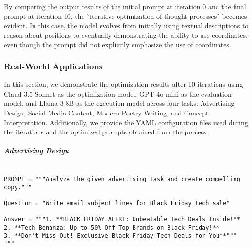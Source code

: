 By comparing the output results of the initial prompt at iteration 0 and the final prompt at iteration 10, the ``iterative optimization of thought processes'' becomes evident. In this case, the model evolves from initially using textual descriptions to reason about positions to eventually demonstrating the ability to use coordinates, even though the prompt did not explicitly emphasize the use of coordinates.


\subsubsection{Real-World Applications}
\label{appendix:open-ended}



In this section, we demonstrate the optimization results after 10 iterations using Claud-3.5-Sonnet as the optimization model, GPT-4o-mini as the evaluation model, and Llama-3-8B as the execution model across four tasks: Advertising Design, Social Media Content, Modern Poetry Writing, and Concept Interpretation. Additionally, we provide the YAML configuration files used during the iterations and the optimized prompts obtained from the process.

\subparagraph{Advertising Design} \mbox{} 

\begin{tcolorbox}[title={\textbf{\small Performance Before Optimization}}, boxrule=2pt, arc=0mm, breakable]
\begin{verbatim}

PROMPT = """Analyze the given advertising task and create compelling copy."""

Question = "Write email subject lines for Black Friday tech sale"

Answer = """1. **BLACK FRIDAY ALERT: Unbeatable Tech Deals Inside!**
2. **Tech Bonanza: Up to 50% Off Top Brands on Black Friday!**
3. **Don't Miss Out! Exclusive Black Friday Tech Deals for You**"""
"""

\end{verbatim}
\end{tcolorbox}

